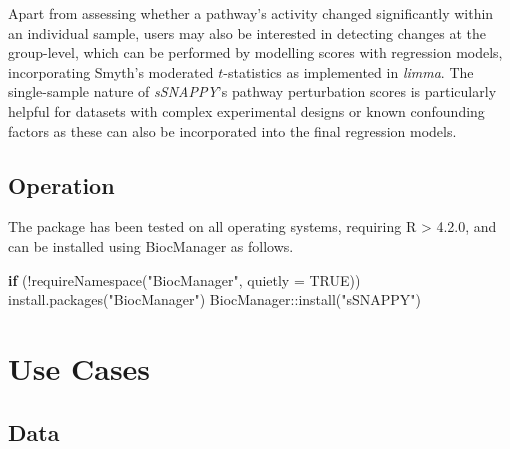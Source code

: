 \documentclass[9pt,a4paper,]{extarticle}
\newenvironment{Shaded}{\begin{snugshade}}{\end{snugshade}}
\newcommand{\AttributeTok}[1]{\textcolor[rgb]{0.77,0.63,0.00}{#1}}
\newcommand{\ConstantTok}[1]{\textcolor[rgb]{0.00,0.00,0.00}{#1}}
\newcommand{\ControlFlowTok}[1]{\textcolor[rgb]{0.13,0.29,0.53}{\textbf{#1}}}
\newcommand{\FunctionTok}[1]{\textcolor[rgb]{0.00,0.00,0.00}{#1}}
\newcommand{\NormalTok}[1]{#1}
\newcommand{\SpecialCharTok}[1]{\textcolor[rgb]{0.00,0.00,0.00}{#1}}
\newcommand{\StringTok}[1]{\textcolor[rgb]{0.31,0.60,0.02}{#1}}
\begin{document}
Apart from assessing whether a pathway's activity changed significantly within an individual sample, users may also be interested in detecting changes at the group-level, which can be performed by modelling scores with regression models, incorporating Smyth's moderated \(t\)-statistics\citep{Smyth_2004} as implemented in \emph{limma}\citep{limma_2015}.
The single-sample nature of \emph{sSNAPPY}'s pathway perturbation scores is particularly helpful for datasets with complex experimental designs or known confounding factors as these can also be incorporated into the final regression models.

\hypertarget{operation}{%
\subsection{Operation}\label{operation}}

The package has been tested on all operating systems, requiring R \textgreater{} 4.2.0, and can be installed using BiocManager as follows.

\begin{Shaded}
\begin{Highlighting}[]
\ControlFlowTok{if}\NormalTok{ (}\SpecialCharTok{!}\FunctionTok{requireNamespace}\NormalTok{(}\StringTok{"BiocManager"}\NormalTok{, }\AttributeTok{quietly =} \ConstantTok{TRUE}\NormalTok{))}
  \FunctionTok{install.packages}\NormalTok{(}\StringTok{"BiocManager"}\NormalTok{)}
\NormalTok{BiocManager}\SpecialCharTok{::}\FunctionTok{install}\NormalTok{(}\StringTok{"sSNAPPY"}\NormalTok{)}
\end{Highlighting}
\end{Shaded}

\hypertarget{use-cases}{%
\section{Use Cases}\label{use-cases}}

\hypertarget{data}{%
\subsection{Data}\label{data}}
\end{document}
